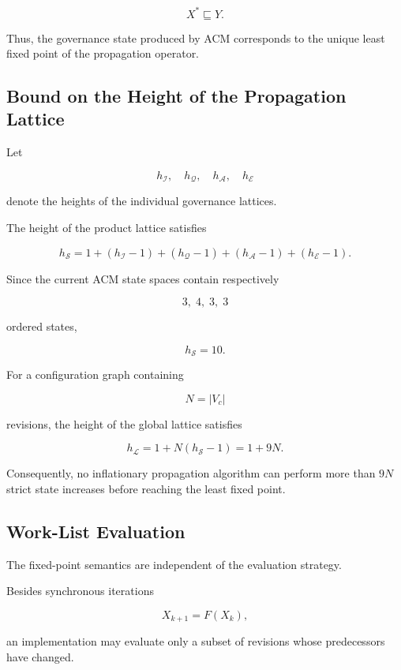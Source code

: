 \documentclass[10pt]{article}
\begin{document}
\[
X^\ast
\sqsubseteq
Y.
\]

Thus, the governance state produced by ACM corresponds to the unique least
fixed point of the propagation operator.


\subsection{Bound on the Height of the Propagation Lattice}

Let

\[
h_{\mathcal{I}},
\quad
h_{\mathcal{Q}},
\quad
h_{\mathcal{A}},
\quad
h_{\mathcal{E}}
\]

denote the heights of the individual governance lattices.

The height of the product lattice satisfies

\[
h_{\mathcal{S}}
=
1
+
(h_{\mathcal{I}}-1)
+
(h_{\mathcal{Q}}-1)
+
(h_{\mathcal{A}}-1)
+
(h_{\mathcal{E}}-1).
\]

Since the current ACM state spaces contain respectively

\[
3,\;
4,\;
3,\;
3
\]

ordered states,

\[
h_{\mathcal{S}}
=
10.
\]

For a configuration graph containing

\[
N=|V_c|
\]

revisions, the height of the global lattice satisfies

\[
h_{\mathcal{L}}
=
1
+
N(h_{\mathcal{S}}-1)
=
1+9N.
\]

Consequently, no inflationary propagation algorithm can perform more than
$9N$ strict state increases before reaching the least fixed point.


\subsection{Work-List Evaluation}

The fixed-point semantics are independent of the evaluation strategy.

Besides synchronous iterations

\[
X_{k+1}=F(X_k),
\]

an implementation may evaluate only a subset of revisions whose predecessors
have changed.
\end{document}
